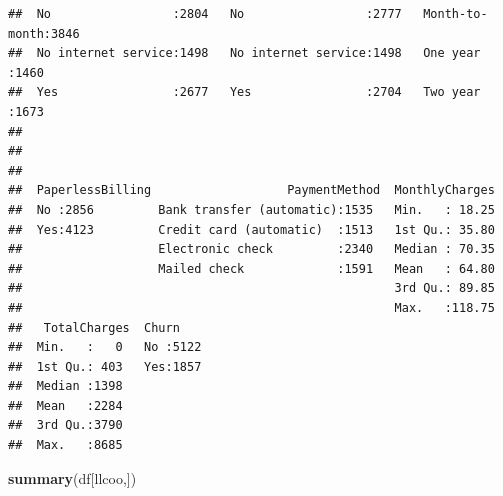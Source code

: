 \documentclass[
]{article}
\newenvironment{Shaded}{\begin{snugshade}}{\end{snugshade}}
\newcommand{\FunctionTok}[1]{\textcolor[rgb]{0.13,0.29,0.53}{\textbf{#1}}}
\newcommand{\NormalTok}[1]{#1}
\begin{document}
\begin{verbatim}
##  No                 :2804   No                 :2777   Month-to-month:3846  
##  No internet service:1498   No internet service:1498   One year      :1460  
##  Yes                :2677   Yes                :2704   Two year      :1673  
##                                                                             
##                                                                             
##                                                                             
##  PaperlessBilling                   PaymentMethod  MonthlyCharges  
##  No :2856         Bank transfer (automatic):1535   Min.   : 18.25  
##  Yes:4123         Credit card (automatic)  :1513   1st Qu.: 35.80  
##                   Electronic check         :2340   Median : 70.35  
##                   Mailed check             :1591   Mean   : 64.80  
##                                                    3rd Qu.: 89.85  
##                                                    Max.   :118.75  
##   TotalCharges  Churn     
##  Min.   :   0   No :5122  
##  1st Qu.: 403   Yes:1857  
##  Median :1398             
##  Mean   :2284             
##  3rd Qu.:3790             
##  Max.   :8685
\end{verbatim}

\begin{Shaded}
\begin{Highlighting}[]
\FunctionTok{summary}\NormalTok{(df[llcoo,])}
\end{Highlighting}
\end{Shaded}
\end{document}
